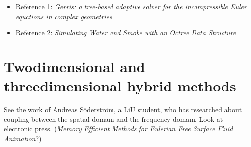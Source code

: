 \begin{itemize}
    \item Reference 1: \textit{\href{http://gfs.sourceforge.net/gerris.pdf}{Gerris: a tree-based adaptive solver for the incompressible Euler equations in complex geometries}}
    \item Reference 2: \textit{\href{http://physbam.stanford.edu/~fedkiw/papers/stanford2004-02.pdf}{Simulating Water and Smoke with an Octree Data Structure}}
\end{itemize}

\section{Twodimensional and threedimensional hybrid methods}

See the work of Andreas Söderström, a LiU student, who has researched about coupling between the spatial domain and the frequency domain. Look at electronic press. (\textit{Memory Efficient Methods for Eulerian Free Surface Fluid Animation}?)